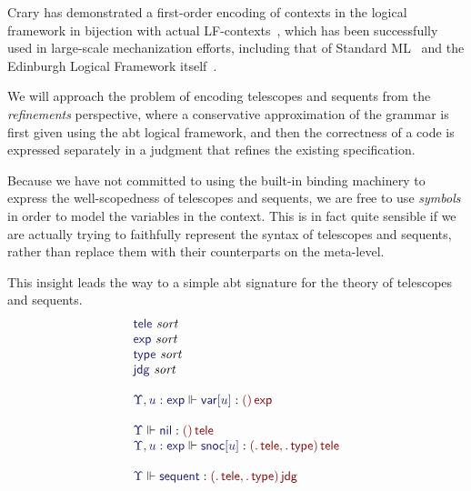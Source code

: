 \documentclass[11pt]{article}
\theoremstyle{definition}
\theoremstyle{remark}
\numberwithin{equation}{section}
\def\IModeColorName{MidnightBlue}
\def\OModeColorName{Maroon}
\newcommand\IMode[1]{{\color{\IModeColorName}{#1}}}
\newcommand\OMode[1]{{\color{\OModeColorName}{#1}}}
\newcommand\MkValence[3]{%
  \ifthenelse{\equal{#1}{}}{}{%
    \{#1\}%
  }%
  \ifthenelse{\equal{#2}{}}{}{%
    [#2]%
  }.\, #3%
}
\newcommand\MkArity[2]{(#1)\, #2}
\newcommand\IsSort[1]{\IMode{#1}\ \textit{sort}}
\newcommand\IsOperator[3]{\IMode{#1}\Vdash\IMode{#2}: \OMode{#3}}
\begin{document}
Crary has demonstrated a first-order encoding of contexts in the logical
framework in bijection with actual LF-contexts~\cite{crary:2009}, which has
been successfully used in large-scale mechanization efforts, including that of
Standard ML~\cite{lee-crary-harper:2007} and the Edinburgh Logical Framework
itself~\cite{martens-crary:2012}.


We will approach the problem of encoding telescopes and sequents from the
\emph{refinements} perspective, where a conservative approximation of the
grammar is first given using the abt logical framework, and then the
correctness of a code is expressed separately in a judgment that refines the
existing specification.

Because we have not committed to using the built-in binding machinery to
express the well-scopedness of telescopes and sequents, we are free to use
\emph{symbols} in order to model the variables in the context. This is in fact
quite sensible if we are actually trying to faithfully represent the syntax of
telescopes and sequents, rather than replace them with their counterparts on
the meta-level.

This insight leads the way to a simple abt signature for the theory of telescopes
and sequents.
%
\newcommand\SortTele{\mathsf{tele}}
\newcommand\SortJdg{\mathsf{jdg}}
\newcommand\SortType{\mathsf{type}}
\newcommand\SortExpr{\mathsf{exp}}
\newcommand\OpNil{\mathsf{nil}}
\newcommand\OpSnoc[1]{\mathsf{snoc}[#1]}
\newcommand\OpVar[1]{\mathsf{var}[#1]}
\newcommand\OpSequent{\mathsf{sequent}}
%
\[
  \begin{array}{l}
    \IsSort{\SortTele}\\
    \IsSort{\SortExpr}\\
    \IsSort{\SortType}\\
    \IsSort{\SortJdg}\\\\
    \IsOperator{\Upsilon, u:\SortExpr}{\OpVar{u}}{
      \MkArity{}{\SortExpr}
    }\\\\
    \IsOperator{\Upsilon}{\OpNil}{
      \MkArity{}{\SortTele}
    }\\
    \IsOperator{\Upsilon, u:\SortExpr}{\OpSnoc{u}}{
      \MkArity{
        \MkValence{}{}{\SortTele},
        \MkValence{}{}{\SortType}
      }{\SortTele}
    }\\\\
    \IsOperator{\Upsilon}{\OpSequent}{
      \MkArity{
        \MkValence{}{}{\SortTele},
        \MkValence{}{}{\SortType}
      }{\SortJdg}
    }
  \end{array}
\]
\end{document}
